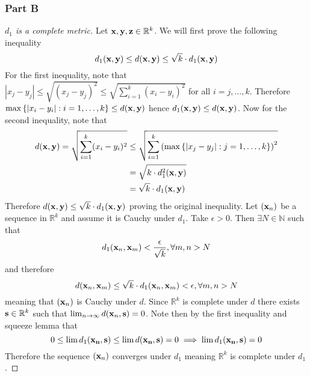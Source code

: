 \documentclass[12pt,titlepage]{extarticle}
\begin{document}
\subsubsection*{Part B}
\begin{proof}[$d_1$ is a complete metric]
    Let $\vb{x},\vb{y},\vb{z} \in \mathbb{R}^k$. We will first prove the following inequality
    \[
        d_1(\vb{x},\vb{y}) \leq d(\vb{x},\vb{y}) \leq \sqrt{k} \cdot d_1(\vb{x},\vb{y})
    \]
    For the first inequality, note that $|x_j - y_j| \leq \sqrt{(x_j - y_j)^2} \leq \sqrt{\sum_{i=1}^k (x_i - y_i)^2}$ for all $i=j,\ldots,k$. Therefore $\max\qty{|x_i - y_i| : i = 1,\ldots,k} \leq d(\vb{x},\vb{y})$ hence $d_1(\vb{x},\vb{y}) \leq d(\vb{x},\vb{y})$. Now for the second inequality, note that
    \begin{align*}
        d(\vb{x},\vb{y}) = \sqrt{\sum_{i=1}^k (x_i - y_i)^2} &\leq \sqrt{\sum_{i=1}^k \qty(\max\qty{|x_j - y_j| : j = 1,\ldots, k})^2} \\
                                                   &= \sqrt{k \cdot d_1^2(\vb{x},\vb{y})} \\
                                                   &= \sqrt{k} \cdot d_1(\vb{x},\vb{y})
    \end{align*}
    Therefore $d(\vb{x},\vb{y}) \leq \sqrt{k} \cdot d_1(\vb{x},\vb{y})$ proving the original inequality. Let $(\vb{x}_n)$ be a sequence in $\mathbb{R}^k$ and assume it is Cauchy under $d_1$. Take $\epsilon > 0$. Then $\exists N \in \mathbb{N}$ such that
    \[
        d_1(\vb{x}_n, \vb{x}_m) < \frac{\epsilon}{\sqrt{k}}, \forall m,n > N
    \]
    and therefore
    \[
        d(\vb{x}_n, \vb{x}_m) \leq \sqrt{k} \cdot d_1(\vb{x}_n, \vb{x}_m) < \epsilon, \forall m,n > N
    \]
    meaning that $(\vb{x}_n)$ is Cauchy under $d$. Since $\mathbb{R}^k$ is complete under $d$ there exists $\vb{s} \in \mathbb{R}^k$ such that $\lim_{n\to \infty} d(\vb{x}_n, \vb{s}) = 0$. Note then by the first inequality and squeeze lemma that
    \[
        0 \leq \lim d_1(\vb{x_n}, \vb{s}) \leq \lim d(\vb{x_n}, \vb{s}) = 0 \implies \lim d_1(\vb{x_n}, \vb{s}) = 0
    \]
    Therefore the sequence $(\vb{x}_n)$ converges under $d_1$ meaning $\mathbb{R}^k$ is complete under $d_1$.
\end{proof}
\end{document}
